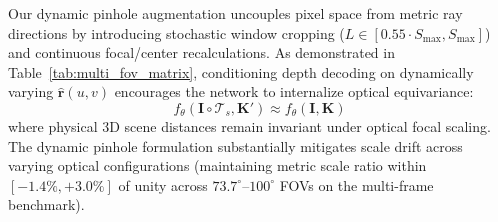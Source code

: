 Our dynamic pinhole augmentation uncouples pixel space from metric ray directions by introducing stochastic window cropping ($L \in [0.55\cdot S_{\max}, S_{\max}]$) and continuous focal/center recalculations. As demonstrated in Table~\ref{tab:multi_fov_matrix}, conditioning depth decoding on dynamically varying $\hat{\mathbf{r}}(u, v)$ encourages the network to internalize optical equivariance:
\begin{equation}
    f_\theta(\mathbf{I} \circ \mathcal{T}_s, \mathbf{K}') \approx f_\theta(\mathbf{I}, \mathbf{K})
\end{equation}
where physical 3D scene distances remain invariant under optical focal scaling. The dynamic pinhole formulation substantially mitigates scale drift across varying optical configurations (maintaining metric scale ratio within $[-1.4\%, +3.0\%]$ of unity across $73.7^\circ \text{--} 100^\circ$ FOVs on the multi-frame benchmark).

